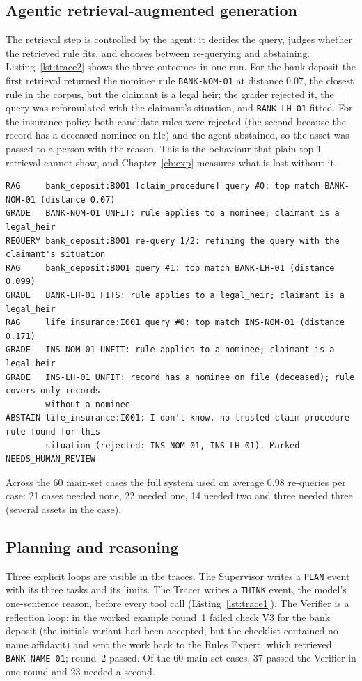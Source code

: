 \documentclass[12pt,a4paper,oneside]{report}
\begin{document}
\subsection{Agentic retrieval-augmented generation}
The retrieval step is controlled by the agent: it decides the query, judges whether the retrieved rule fits, and chooses between re-querying and abstaining. Listing~\ref{lst:trace2} shows the three outcomes in one run. For the bank deposit the first retrieval returned the nominee rule \texttt{BANK-NOM-01} at distance 0.07, the closest rule in the corpus, but the claimant is a legal heir; the grader rejected it, the query was reformulated with the claimant's situation, and \texttt{BANK-LH-01} fitted. For the insurance policy both candidate rules were rejected (the second because the record has a deceased nominee on file) and the agent abstained, so the asset was passed to a person with the reason. This is the behaviour that plain top-1 retrieval cannot show, and Chapter~\ref{ch:exp} measures what is lost without it.

\begin{lstlisting}[caption={Retrieval grading, re-query and abstention in the worked example (from the trace).},label={lst:trace2},numbers=none,basicstyle=\ttfamily\scriptsize\setstretch{1.0}]
RAG     bank_deposit:B001 [claim_procedure] query #0: top match BANK-NOM-01 (distance 0.07)
GRADE   BANK-NOM-01 UNFIT: rule applies to a nominee; claimant is a legal_heir
REQUERY bank_deposit:B001 re-query 1/2: refining the query with the claimant's situation
RAG     bank_deposit:B001 query #1: top match BANK-LH-01 (distance 0.099)
GRADE   BANK-LH-01 FITS: rule applies to a legal_heir; claimant is a legal_heir
RAG     life_insurance:I001 query #0: top match INS-NOM-01 (distance 0.171)
GRADE   INS-NOM-01 UNFIT: rule applies to a nominee; claimant is a legal_heir
GRADE   INS-LH-01 UNFIT: record has a nominee on file (deceased); rule covers only records
        without a nominee
ABSTAIN life_insurance:I001: I don't know. no trusted claim procedure rule found for this
        situation (rejected: INS-NOM-01, INS-LH-01). Marked NEEDS_HUMAN_REVIEW
\end{lstlisting}

Across the 60 main-set cases the full system used on average 0.98 re-queries per case: 21 cases needed none, 22 needed one, 14 needed two and three needed three (several assets in the case).

\subsection{Planning and reasoning}
Three explicit loops are visible in the traces. The Supervisor writes a \texttt{PLAN} event with its three tasks and its limits. The Tracer writes a \texttt{THINK} event, the model's one-sentence reason, before every tool call (Listing~\ref{lst:trace1}). The Verifier is a reflection loop: in the worked example round~1 failed check V3 for the bank deposit (the initials variant had been accepted, but the checklist contained no name affidavit) and sent the work back to the Rules Expert, which retrieved \texttt{BANK-NAME-01}; round~2 passed. Of the 60 main-set cases, 37 passed the Verifier in one round and 23 needed a second.
\end{document}

